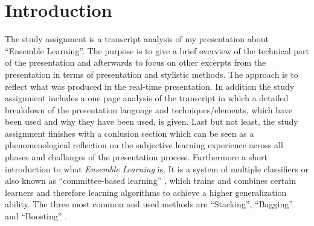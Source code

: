 \chapter{Introduction}

The study assignment is a transcript analysis of my presentation about \enquote{Ensemble Learning}. The purpose is to give a brief overview of the technical part of the presentation and afterwards to focus on other excerpts from the presentation in terms of presentation and stylistic methods. The approach is to reflect what was produced in the real-time presentation. In addition the study assignment includes a one page analysis of the transcript in which a detailed breakdown of the presentation language and techniques/elements, which have been used and why they have been used, is given. Last but not least, the study assignment finishes with a conlusion section which can be seen as a phenomenological reflection on the subjective learning experience across all phases and challanges of the presentation process. Furthermore a short introduction to what \textit{Ensemble Learning} is. It is a system of multiple classifiers or also known as \enquote{committee-based learning} \autocite[]{Zhou.2021}, which trains and combines certain learners and therefore learning algorithms to achieve a higher generalization ability. The three most common and used methods are \enquote{Stacking}, \enquote{Bagging} and \enquote{Boosting} \autocite[]{Zhou.2021} \autocite[]{Zhou.2012}.